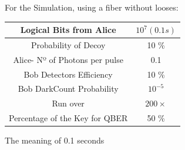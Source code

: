 \documentclass[1000pt]{article}
\begin{document}
For the Simulation, using a fiber without looses:
\begin{table}[hbt!]
\centering
\Large
\begin{tabular}{|c|c|}
\hline
\cellcolor[HTML]{005288}\color{white} Logical Bits from Alice & $10^{7} (0.1 s)$ \\ \hline
\cellcolor[HTML]{005288}\color{white} Probability of Decoy & 10 \% \\ \hline
\cellcolor[HTML]{005288}\color{white} Alice- Nº of Photons per pulse & 0.1\\ \hline
\cellcolor[HTML]{005288}\color{white} Bob Detectors Efficiency  & 10 \% \\ \hline
\cellcolor[HTML]{005288}\color{white} Bob DarkCount Probability & $10^{-5}$ \\ \hline
\cellcolor[HTML]{005288}\color{white} Run over & $200 \times$\\ \hline
\cellcolor[HTML]{005288}\color{white} Percentage of the Key for QBER & 50 \% \\ \hline

\end{tabular}
\end{table}

\vspace*{0.5cm}
The meaning of 0.1 seconds
\vspace*{0.5cm}
\end{document}
